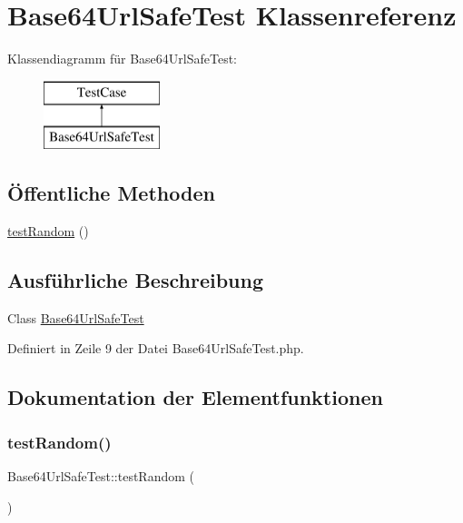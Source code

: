 \hypertarget{class_base64_url_safe_test}{}\section{Base64\+Url\+Safe\+Test Klassenreferenz}
\label{class_base64_url_safe_test}
Klassendiagramm für Base64\+Url\+Safe\+Test\+:\begin{figure}[H]
\begin{center}
\leavevmode
\includegraphics[height=2.000000cm]{class_base64_url_safe_test}
\end{center}
\end{figure}
\subsection*{Öffentliche Methoden}
\begin{DoxyCompactItemize}
\item 
\mbox{\hyperlink{class_base64_url_safe_test_a456eb2fe1f2afe387e8701c4112317c3}{test\+Random}} ()
\end{DoxyCompactItemize}


\subsection{Ausführliche Beschreibung}
Class \mbox{\hyperlink{class_base64_url_safe_test}{Base64\+Url\+Safe\+Test}} 

Definiert in Zeile 9 der Datei Base64\+Url\+Safe\+Test.\+php.



\subsection{Dokumentation der Elementfunktionen}
\mbox{\label{class_base64_url_safe_test_a456eb2fe1f2afe387e8701c4112317c3}} 
\subsubsection{\texorpdfstring{test\+Random()}{testRandom()}}
{\footnotesize\ttfamily Base64\+Url\+Safe\+Test\+::test\+Random (\begin{DoxyParamCaption}{ }\end{DoxyParamCaption})}

